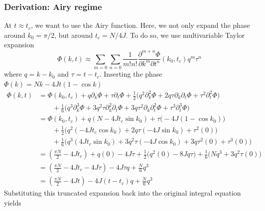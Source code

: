 \documentclass[../../../main.tex]{subfiles}
\begin{document}
\subsubsection{Derivation: Airy regime}
At $t \approx t_c$, we want to use the Airy function.
Here, we not only expand the phase around $k_0 = \pi/2$, but around $t_c = N/4J$.
To do so, we use multivariable Taylor expansion
\begin{equation*}
    \Phi(k, t) \approx \sum_{m=0} \sum_{n=0} \frac{1}{m!n!} \frac{\partial^{m+n}\Phi}{\partial k^m \partial t^n}\left(k_0, t_c\right) q^m \tau^n
\end{equation*}
where $q=k-k_0 $ and $\tau = t-t_c$.
Inserting the phase $        \Phi(k)  =  Nk - 4Jt (1  - \cos k) $
\begin{align*}
    \Phi (k,t) & = \Phi(k_0,t_c) + q\partial_k\Phi  +\tau \partial_t \Phi  + \frac{1}{2} \big( q^2 \partial_k^2\Phi  + 2 q\tau \partial _k  \partial_t  \Phi  + \tau^2 \partial_t^2  \Phi\big) \\
               & \qquad + \frac{1}{6}\big(q^3\partial_k ^{3}\Phi  + 3q^2\tau \partial_k ^{2}\partial_t\Phi + 3 q\tau^2 \partial_k\partial_t^2\Phi + \tau^3 \partial_t^3\Phi \big)              \\
               & = \Phi(k_0,t_c) + q(N - 4Jt_c \sin k_0 ) + \tau \big( -4J(1-\cos k_0) \big)                                                                                                   \\
               & \qquad + \frac{1}{2} \big( q^2 (-4Jt_c \cos k_0) + 2q\tau (-4J \sin k_0) + \tau^2 (0) \big)                                                                                   \\
               & \qquad + \frac{1}{6} \big( q^3 (4Jt_c \sin k_0) + 3q^2\tau (-4J \cos k_0) + 3q\tau^2 (0) + \tau^3 (0) \big)                                                                   \\
               & = \left( \frac{\pi N}{2} - 4Jt_c \right) + q(0) - 4J\tau + \frac{1}{2} \big( q^2(0) - 8Jq\tau \big) + \frac{1}{6} \big( Nq^3 + 3q^2\tau(0) \big)                              \\
               & = \left( \frac{\pi N}{2} - 4Jt_c - 4J\tau \right) - 4J\tau q + \frac{N}{6}q^3                                                                                                 \\
               & = \left( \frac{\pi N}{2} - 4Jt \right) - 4J(t-t_c)q + \frac{N}{6}q^3
\end{align*}
Substituting this truncated  expansion back into the original integral equation yields
\end{document}
